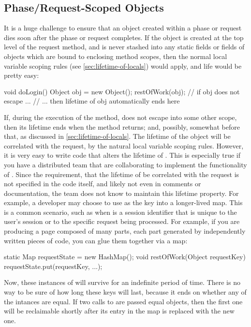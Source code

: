 \subsection{Phase/Request-Scoped Objects}

It is a huge challenge to ensure that an object created within a phase or request
dies soon after the phase or request completes. If the object is created at the
top level of the request method, and is never stashed into any static fields or
fields of objects which are bound to enclosing method scopes, then the normal
local variable scoping rules (see \autoref{sec:lifetime-of-locals}) would apply,
and life would be pretty easy:
\begin{shortlisting}
void doLogin() {
   Object obj = new Object();
   restOfWork(obj); // if obj does not escape ...
} // ... then lifetime of obj automatically ends here
\end{shortlisting}
If, during the execution of the  method,   does not
escape into some other scope, then its lifetime ends when the 
method returns; and, possibly, somewhat before that, as discussed in
\autoref{sec:lifetime-of-locals}. The lifetime of the
object  will be correlated with the  request, by the
natural local variable scoping rules. However, it is very easy to write code that
alters the lifetime of . This is especially true if you have a
distributed team that are collaborating to implement the functionality of
. Since the requirement, that the lifetime of  be
correlated with the  request is not specified in the code itself,
and likely not even in comments or documentation, the team does not know to
maintain this lifetime property. For example, a developer may choose to use
 as the key into a longer-lived map. This is a common scenario, such
as when  is a session identifier that is unique to the user's session
or to the specific request being processed. For example, if you are producing a
page composed of many parts, each part generated by independently written pieces
of code, you can glue them together via a  map:
\begin{shortlisting}
static Map requestState = new HashMap();
void restOfWork(Object requestKey) {
   requestState.put(requestKey, ...);
}
\end{shortlisting}
Now, these instances of  will survive for an indefinite period of
time. There is no way to be sure of how long these keys will last, because it
ends on whether any of the  intances are equal. If two calls to
 are passed equal objects, then the first one will be
reclaimable shortly after its entry in the map is replaced with the new one. 

